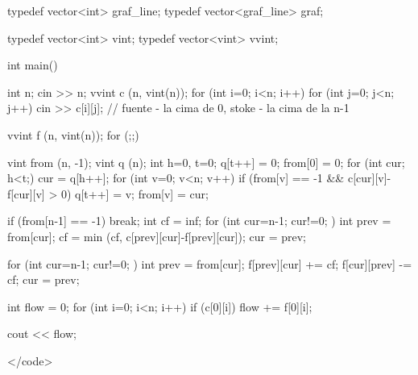 typedef vector<int> graf_line;
typedef vector<graf_line> graf;

typedef vector<int> vint;
typedef vector<vint> vvint;


int main()
{
int n;
cin >> n;
vvint c (n, vint(n));
for (int i=0; i<n; i++)
for (int j=0; j<n; j++)
cin >> c[i][j];
// fuente - la cima de 0, stoke - la cima de la n-1

vvint f (n, vint(n));
for (;;)
{

vint from (n, -1);
vint q (n);
int h=0, t=0;
q[t++] = 0;
from[0] = 0;
for (int cur; h<t;)
{
cur = q[h++];
for (int v=0; v<n; v++)
if (from[v] == -1 &&
c[cur][v]-f[cur][v] > 0)
{
q[t++] = v;
from[v] = cur;
}
}

if (from[n-1] == -1)
break;
int cf = inf;
for (int cur=n-1; cur!=0; )
{
int prev = from[cur];
cf = min (cf, c[prev][cur]-f[prev][cur]);
cur = prev;
}

for (int cur=n-1; cur!=0; )
{
int prev = from[cur];
f[prev][cur] += cf;
f[cur][prev] -= cf;
cur = prev;
}

}

int flow = 0;
for (int i=0; i<n; i++)
if (c[0][i])
flow += f[0][i];

cout << flow;

}</code>